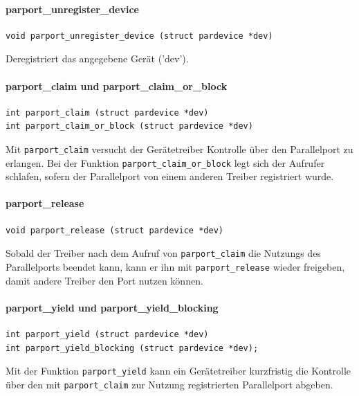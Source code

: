 \documentclass[a4paper,11pt]{article}
\begin{document}
\paragraph{parport\_unregister\_device}

\begin{verbatim}
void parport_unregister_device (struct pardevice *dev)
\end{verbatim}

Deregistriert das angegebene Gerät ('dev').

\paragraph{parport\_claim und parport\_claim\_or\_block}

\begin{verbatim}
int parport_claim (struct pardevice *dev)
int parport_claim_or_block (struct pardevice *dev)
\end{verbatim}

Mit \verb|parport_claim| versucht der Gerätetreiber Kontrolle über den Parallelport zu erlangen.
Bei der Funktion \verb|parport_claim_or_block| legt sich der Aufrufer schlafen, sofern der
Parallelport von einem anderen Treiber registriert wurde.

\paragraph{parport\_release}

\begin{verbatim}
void parport_release (struct pardevice *dev)
\end{verbatim}

Sobald der Treiber nach dem Aufruf von \verb|parport_claim| die Nutzungs des Parallelports beendet kann,
kann er ihn mit \verb|parport_release| wieder freigeben, damit andere Treiber den Port nutzen können.

\paragraph{parport\_yield und parport\_yield\_blocking}

\begin{verbatim}
int parport_yield (struct pardevice *dev)
int parport_yield_blocking (struct pardevice *dev);
\end{verbatim}

Mit der Funktion \verb|parport_yield| kann ein Gerätetreiber kurzfristig die Kontrolle über den mit
\verb|parport_claim| zur Nutzung registrierten Parallelport abgeben.
\end{document}
